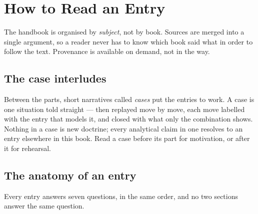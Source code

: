 \chapter*{How to Read an Entry}

The handbook is organised by \emph{subject}, not by book. Sources are merged
into a single argument, so a reader never has to know which book said what in
order to follow the text. Provenance is available on demand, not in the way.

\section*{The case interludes}

Between the parts, short narratives called \emph{cases} put the entries to
work. A case is one situation told straight --- then replayed move by move,
each move labelled with the entry that models it, and closed with what only
the combination shows. Nothing in a case is new doctrine; every analytical
claim in one resolves to an entry elsewhere in this book. Read a case
before its part for motivation, or after it for rehearsal.

\section*{The anatomy of an entry}

Every entry answers seven questions, in the same order, and no two
sections answer the same question.

